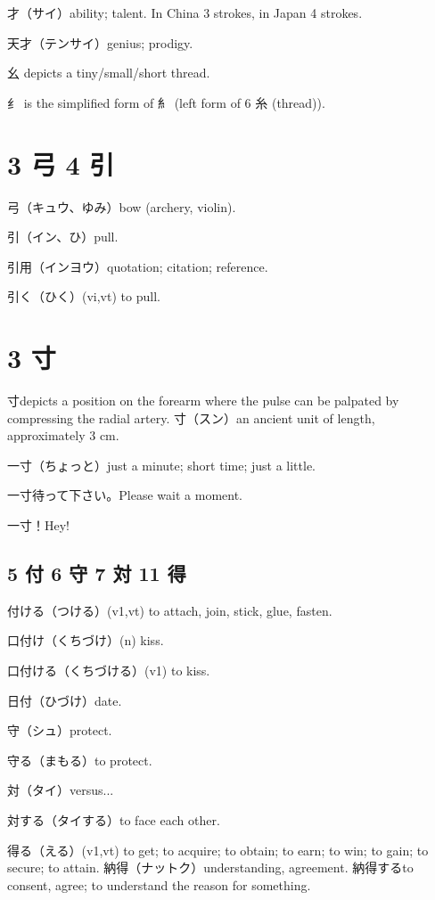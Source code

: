 才（サイ）ability; talent.
In China 3 strokes, in Japan 4 strokes.

天才（テンサイ）genius; prodigy.

幺 depicts a tiny/small/short thread.

纟 is the simplified form of 糹
(left form of 6 糸 (thread)).

\section{3 弓 4 引}

弓（キュウ、ゆみ）bow (archery, violin).

引（イン、ひ）pull.

引用（インヨウ）quotation; citation; reference.

引く（ひく）(vi,vt) to pull.


\section{3 寸}

寸depicts a position on the forearm
where the pulse can be palpated by compressing the radial artery.
寸（スン）an ancient unit of length, approximately 3 cm.

一寸（ちょっと）just a minute; short time; just a little.

一寸待って下さい。Please wait a moment.

一寸！Hey!

\subsection{5 付 6 守 7 対 11 得}

付ける（つける）(v1,vt) to attach, join, stick, glue, fasten.

口付け（くちづけ）(n) kiss.

口付ける（くちづける）(v1) to kiss.

日付（ひづけ）date.

守（シュ）protect.

守る（まもる）to protect.

対（タイ）versus...

対する（タイする）to face each other.

得る（える）(v1,vt) to get; to acquire; to obtain; to earn; to win; to gain; to secure; to attain.
納得（ナットク）understanding, agreement.
納得するto consent, agree; to understand the reason for something.

